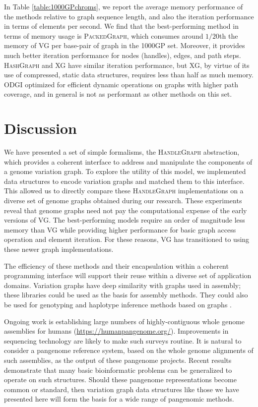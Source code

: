 \documentclass[11pt]{ucthesis}
\begin{document}
In Table \ref{table:1000GPchroms}, we report the average memory performance of the methods relative to graph sequence length, and also the iteration performance in terms of elements per second.
We find that the best-performing method in terms of memory usage is \textsc{PackedGraph}, which consumes around $1/20$th the memory of \textsc{VG} per base-pair of graph in the 1000GP set.
Moreover, it provides much better iteration performance for nodes (handles), edges, and path steps.
\textsc{HashGraph} and \textsc{XG} have similar iteration performance, but \textsc{XG}, by virtue of its use of compressed, static data structures, requires less than half as much memory.
\textsc{ODGI} optimized for efficient dynamic operations on graphs with higher path coverage, and in general is not as performant as other methods on this set.


\section{Discussion}

We have presented a set of simple formalisms, the \textsc{HandleGraph} abstraction, which provides a coherent interface to address and manipulate the components of a genome variation graph.
To explore the utility of this model, we implemented data structures to encode variation graphs and matched them to this interface.
This allowed us to directly compare these \textsc{HandleGraph} implementations on a diverse set of genome graphs obtained during our research.
These experiments reveal that genome graphs need not pay the computational expense of the early versions of \textsc{VG}.
The best-performing models require an order of magnitude less memory than \textsc{VG} while providing higher performance for basic graph access operation and element iteration.
For these reasons, \textsc{VG} has transitioned to using these newer graph implementations. 

The efficiency of these methods and their encapsulation within a coherent programming interface will support their reuse within a diverse set of application domains.
Variation graphs have deep similarity with graphs used in assembly; these libraries could be used as the basis for assembly methods.
They could also be used for genotyping and haplotype inference methods based on graphs \cite{garg2018graph}.

Ongoing work is establishing large numbers of highly-contiguous whole genome assemblies for humans (\url{https://humanpangenome.org/}).
Improvements in sequencing technology are likely to make such surveys routine.
It is natural to consider a pangenome reference system, based on the whole genome alignments of such assemblies, as the output of these pangenome projects.
Recent results demonstrate that many basic bioinformatic problems can be generalized to operate on such structures.
Should these pangenome representations become common or standard, then variation graph data structures like those we have presented here will form the basis for a wide range of pangenomic methods.
\end{document}
